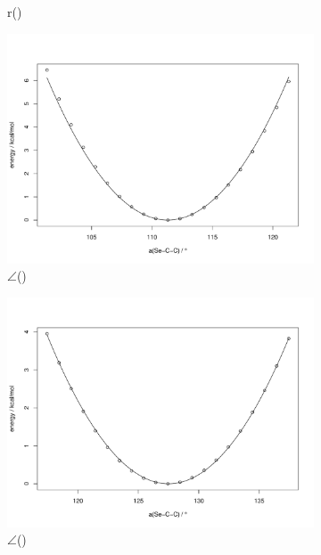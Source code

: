 \begin{refsection}
\begin{figure}
\begin{subfigure}{0.4\linewidth}
        \caption{r()}
    \end{subfigure}
    \begin{subfigure}{0.4\linewidth}
        \includegraphics[width=\linewidth]{Figures/ch2-sifig/SeCC1.pdf}
        \caption{$\angle$()}
    \end{subfigure}
    \begin{subfigure}{0.4\linewidth}
        \includegraphics[width=\linewidth]{Figures/ch2-sifig/SeCC2.pdf}
        \caption{$\angle$()}
    \end{subfigure}
    \begin{subfigure}{0.4\linewidth}

\end{subfigure}
\end{figure}
\end{refsection}
